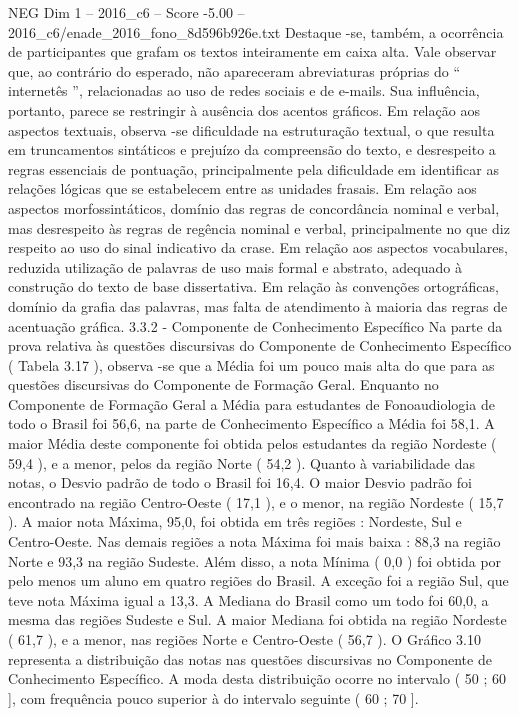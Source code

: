 \begin{textsample}{NEG Dim 1 – 2016\_c6 – Score -5.00 – 2016\_c6/enade\_2016\_fono\_8d596b926e.txt}
Destaque -se, também, a ocorrência de participantes que grafam os textos inteiramente em caixa alta.
Vale observar que, ao contrário do esperado, não apareceram abreviaturas próprias do “ internetês ”, relacionadas ao uso de redes sociais e de e-mails.
Sua influência, portanto, parece se restringir à ausência dos acentos gráficos.
Em relação aos aspectos textuais, observa -se dificuldade na estruturação textual, o que resulta em truncamentos sintáticos e prejuízo da compreensão do texto, e desrespeito a regras essenciais de pontuação, principalmente pela dificuldade em identificar as relações lógicas que se estabelecem entre as unidades frasais.
Em relação aos aspectos morfossintáticos, domínio das regras de concordância nominal e verbal, mas desrespeito às regras de regência nominal e verbal, principalmente no que diz respeito ao uso do sinal indicativo da crase.
Em relação aos aspectos vocabulares, reduzida utilização de palavras de uso mais formal e abstrato, adequado à construção do texto de base dissertativa.
Em relação às convenções ortográficas, domínio da grafia das palavras, mas falta de atendimento à maioria das regras de acentuação gráfica. 3.3.2 - Componente de Conhecimento Específico Na parte da prova relativa às questões discursivas do Componente de Conhecimento Específico ( Tabela 3.17 ), observa -se que a Média foi um pouco mais alta do que para as questões discursivas do Componente de Formação Geral.
Enquanto no Componente de Formação Geral a Média para estudantes de Fonoaudiologia de todo o Brasil foi 56,6, na parte de Conhecimento Específico a Média foi 58,1.
A maior Média deste componente foi obtida pelos estudantes da região Nordeste ( 59,4 ), e a menor, pelos da região Norte ( 54,2 ).
Quanto à variabilidade das notas, o Desvio padrão de todo o Brasil foi 16,4.
O maior Desvio padrão foi encontrado na região Centro-Oeste ( 17,1 ), e o menor, na região Nordeste ( 15,7 ).
A maior nota Máxima, 95,0, foi obtida em três regiões : Nordeste, Sul e Centro-Oeste.
Nas demais regiões a nota Máxima foi mais baixa : 88,3 na região Norte e 93,3 na região Sudeste.
Além disso, a nota Mínima ( 0,0 ) foi obtida por pelo menos um aluno em quatro regiões do Brasil.
A exceção foi a região Sul, que teve nota Máxima igual a 13,3.
A Mediana do Brasil como um todo foi 60,0, a mesma das regiões Sudeste e Sul.
A maior Mediana foi obtida na região Nordeste ( 61,7 ), e a menor, nas regiões Norte e Centro-Oeste ( 56,7 ).
O Gráfico 3.10 representa a distribuição das notas nas questões discursivas no Componente de Conhecimento Específico.
A moda desta distribuição ocorre no intervalo ( 50 ; 60 ], com frequência pouco superior à do intervalo seguinte ( 60 ; 70 ].

\end{textsample}
